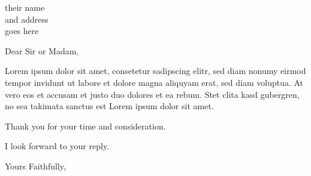 \documentclass{letter}
\begin{document}
\begin{letter}{their name \\ and address \\ goes here}
\opening{Dear Sir or Madam,}

Lorem ipsum dolor sit amet, consetetur sadipscing elitr, sed diam nonumy eirmod
tempor invidunt ut labore et dolore magna aliquyam erat, sed diam voluptua. At
vero eos et accusam et justo duo dolores et ea rebum. Stet clita kasd
gubergren, no sea takimata sanctus est Lorem ipsum dolor sit amet.


Thank you for your time and consideration.

I look forward to your reply.

\closing{Yours Faithfully,}




\end{letter}
\end{document}
